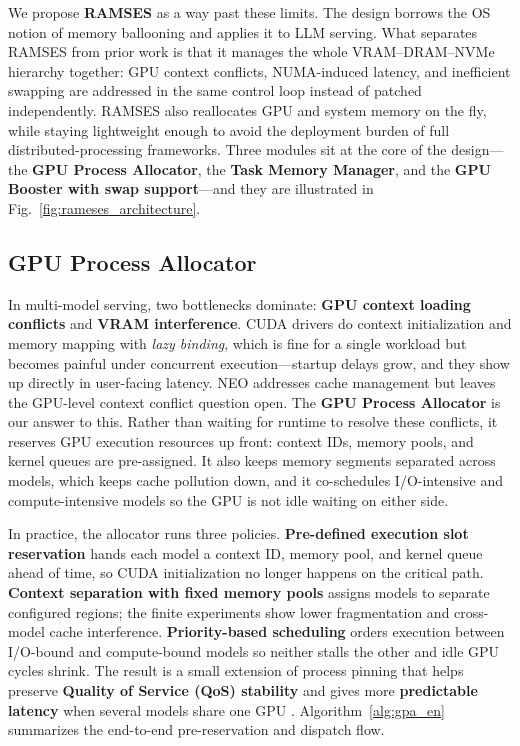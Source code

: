 We propose \textbf{RAMSES} as a way past these limits. The design borrows the OS notion of memory ballooning and applies it to LLM serving. What separates RAMSES from prior work is that it manages the whole VRAM--DRAM--NVMe hierarchy together: GPU context conflicts, NUMA-induced latency, and inefficient swapping are addressed in the same control loop instead of patched independently. RAMSES also reallocates GPU and system memory on the fly, while staying lightweight enough to avoid the deployment burden of full distributed-processing frameworks. Three modules sit at the core of the design---the \textbf{GPU Process Allocator}, the \textbf{Task Memory Manager}, and the \textbf{GPU Booster with swap support}---and they are illustrated in Fig.~\ref{fig:rameses_architecture}.

\subsection{GPU Process Allocator}
In multi-model serving, two bottlenecks dominate: \textbf{GPU context loading conflicts} and \textbf{VRAM interference}. CUDA drivers do context initialization and memory mapping with \textit{lazy binding}, which is fine for a single workload but becomes painful under concurrent execution---startup delays grow, and they show up directly in user-facing latency. NEO \cite{jiang2024neo} addresses cache management but leaves the GPU-level context conflict question open.
The \textbf{GPU Process Allocator} is our answer to this. Rather than waiting for runtime to resolve these conflicts, it reserves GPU execution resources up front: context IDs, memory pools, and kernel queues are pre-assigned. It also keeps memory segments separated across models, which keeps cache pollution down, and it co-schedules I/O-intensive and compute-intensive models so the GPU is not idle waiting on either side.

In practice, the allocator runs three policies.
\textbf{Pre-defined execution slot reservation} hands each model a context ID, memory pool, and kernel queue ahead of time, so CUDA initialization no longer happens on the critical path.
\textbf{Context separation with fixed memory pools} assigns models to separate configured regions; the finite experiments show lower fragmentation and cross-model cache interference.
\textbf{Priority-based scheduling} orders execution between I/O-bound and compute-bound models so neither stalls the other and idle GPU cycles shrink.
The result is a small extension of process pinning that helps preserve \textbf{Quality of Service (QoS) stability} and gives more \textbf{predictable latency} when several models share one GPU \cite{stojkovic2025dynamollm}. Algorithm~\ref{alg:gpa_en} summarizes the end-to-end pre-reservation and dispatch flow.

